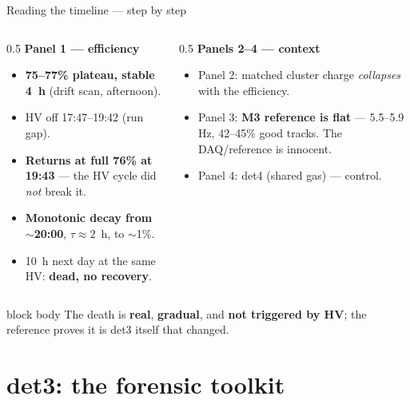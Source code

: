 \documentclass[10pt,aspectratio=169]{beamer}
\newcommand{\keybox}[1]{%
  \begin{center}\begin{beamercolorbox}[wd=0.94\textwidth,sep=6pt,rounded=true,shadow=true]{block body}%
  \centering #1
  \end{beamercolorbox}\end{center}}
\newcommand{\gv}[1]{{\color{good}\textbf{#1}}}
\newcommand{\bv}[1]{{\color{bad}\textbf{#1}}}
\newcommand{\ac}[1]{{\color{acc}\textbf{#1}}}
\begin{document}
\begin{frame}{Reading the timeline --- step by step}
\begin{columns}
\begin{column}{0.5\textwidth}
\textbf{Panel 1 --- efficiency}
\begin{itemize}\footnotesize
  \item \gv{75--77\% plateau, stable 4~h} (drift scan, afternoon).
  \item HV off 17:47--19:42 (run gap).
  \item \ac{Returns at full 76\% at 19:43} --- the HV cycle did \emph{not}
        break it.
  \item \bv{Monotonic decay from $\sim$20:00}, $\tau\approx2$~h, to $\sim$1\%.
  \item 10~h next day at the same HV: \bv{dead, no recovery}.
\end{itemize}
\end{column}
\begin{column}{0.5\textwidth}
\textbf{Panels 2--4 --- context}
\begin{itemize}\footnotesize
  \item Panel 2: matched cluster charge \emph{collapses} with the efficiency.
  \item Panel 3: \gv{M3 reference is flat} --- 5.5--5.9 Hz, 42--45\%
        good tracks. The DAQ/reference is innocent.
  \item Panel 4: det4 (shared gas) --- control.
\end{itemize}
\end{column}
\end{columns}
\vfill
\keybox{The death is \bv{real}, \bv{gradual}, and \bv{not triggered by HV};
the reference proves it is det3 itself that changed.}
\end{frame}

\section{det3: the forensic toolkit}
\end{document}
